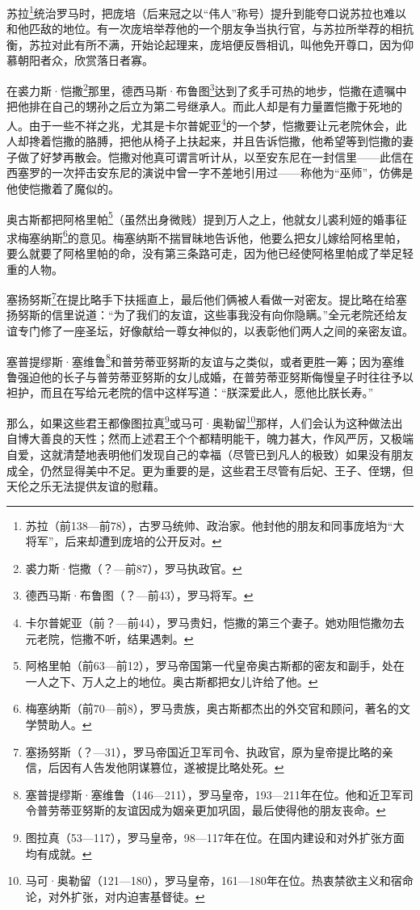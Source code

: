 \par 苏拉\footnote{苏拉（前138—前78），古罗马统帅、政治家。他封他的朋友和同事庞培为“大将军”，后来却遭到庞培的公开反对。}统治罗马时，把庞培（后来冠之以“伟人”称号）提升到能夸口说苏拉也难以和他匹敌的地位。有一次庞培举荐他的一个朋友争当执行官，与苏拉所举荐的相抗衡，苏拉对此有所不满，开始论起理来，庞培便反唇相讥，叫他免开尊口，因为仰慕朝阳者众，欣赏落日者寡。
\par 在裘力斯·恺撒\footnote{裘力斯·恺撒（？—前87），罗马执政官。}那里，德西马斯·布鲁图\footnote{德西马斯·布鲁图（？—前43），罗马将军。}达到了炙手可热的地步，恺撒在遗嘱中把他排在自己的甥孙之后立为第二号继承人。而此人却是有力量置恺撒于死地的人。由于一些不祥之兆，尤其是卡尔普妮亚\footnote{卡尔普妮亚（前？—前44），罗马贵妇，恺撒的第三个妻子。她劝阻恺撒勿去元老院，恺撒不听，结果遇刺。}的一个梦，恺撒要让元老院休会，此人却搀着恺撒的胳膊，把他从椅子上扶起来，并且告诉恺撒，他希望等到恺撒的妻子做了好梦再散会。恺撒对他真可谓言听计从，以至安东尼在一封信里——此信在西塞罗的一次抨击安东尼的演说中曾一字不差地引用过——称他为“巫师”，仿佛是他使恺撒着了魔似的。
\par 奥古斯都把阿格里帕\footnote{阿格里帕（前63—前12），罗马帝国第一代皇帝奥古斯都的密友和副手，处在一人之下、万人之上的地位。奥古斯都把女儿许给了他。}（虽然出身微贱）提到万人之上，他就女儿裘利娅的婚事征求梅塞纳斯\footnote{梅塞纳斯（前70—前8），罗马贵族，奥古斯都杰出的外交官和顾问，著名的文学赞助人。}的意见。梅塞纳斯不揣冒昧地告诉他，他要么把女儿嫁给阿格里帕，要么就要了阿格里帕的命，没有第三条路可走，因为他已经使阿格里帕成了举足轻重的人物。
\par 塞扬努斯\footnote{塞扬努斯（？—31），罗马帝国近卫军司令、执政官，原为皇帝提比略的亲信，后因有人告发他阴谋篡位，遂被提比略处死。}在提比略手下扶摇直上，最后他们俩被人看做一对密友。提比略在给塞扬努斯的信里说道：“为了我们的友谊，这些事我没有向你隐瞒。”全元老院还给友谊专门修了一座圣坛，好像献给一尊女神似的，以表彰他们两人之间的亲密友谊。
\par 塞普提缪斯·塞维鲁\footnote{塞普提缪斯·塞维鲁（146—211），罗马皇帝，193—211年在位。他和近卫军司令普劳蒂亚努斯的友谊因成为姻亲更加巩固，最后使得他的朋友丧命。}和普劳蒂亚努斯的友谊与之类似，或者更胜一筹；因为塞维鲁强迫他的长子与普劳蒂亚努斯的女儿成婚，在普劳蒂亚努斯侮慢皇子时往往予以袒护，而且在写给元老院的信中这样写道：“朕深爱此人，愿他比朕长寿。”
\par 那么，如果这些君王都像图拉真\footnote{图拉真（53—117），罗马皇帝，98—117年在位。在国内建设和对外扩张方面均有成就。}或马可·奥勒留\footnote{马可·奥勒留（121—180），罗马皇帝，161—180年在位。热衷禁欲主义和宿命论，对外扩张，对内迫害基督徒。}那样，人们会认为这种做法出自博大善良的天性；然而上述君王个个都精明能干，魄力甚大，作风严厉，又极端自爱，这就清楚地表明他们发现自己的幸福（尽管已到凡人的极致）如果没有朋友成全，仍然显得美中不足。更为重要的是，这些君王尽管有后妃、王子、侄甥，但天伦之乐无法提供友谊的慰藉。
